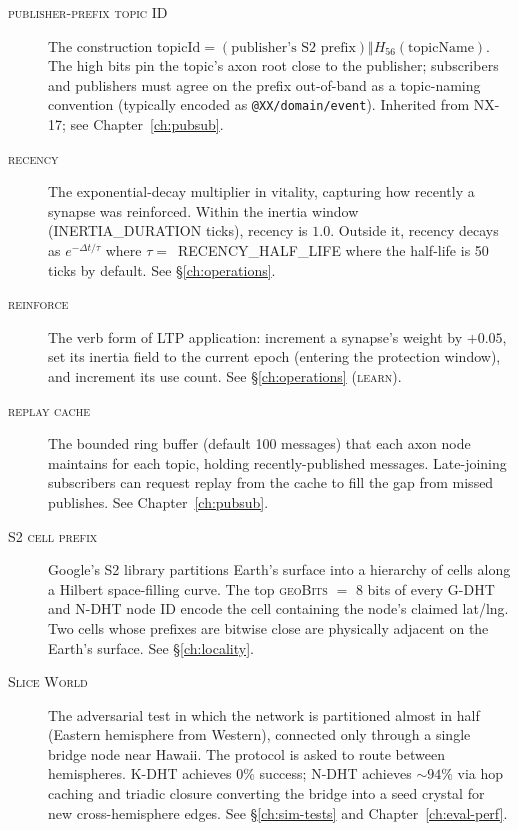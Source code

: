 \documentclass[twoside,nobib]{tufte-book}
\newcommand{\NDHT}{N-DHT\xspace}
\newcommand{\KDHT}{K-DHT\xspace}
\newcommand{\GDHT}{G-DHT\xspace}
\begin{document}
\begin{description}
\item[\textsc{publisher-prefix topic ID}]
The construction $\mathrm{topicId} = (\text{publisher's S2 prefix})
\Vert H_{56}(\mathrm{topicName})$. The high bits pin the topic's
axon root close to the publisher; subscribers and publishers must
agree on the prefix out-of-band as a topic-naming convention
(typically encoded as \texttt{@XX/domain/event}). Inherited from
NX-17; see Chapter~\ref{ch:pubsub}.

\item[\textsc{recency}]
The exponential-decay multiplier in vitality, capturing how
recently a synapse was reinforced. Within the inertia window
(\textsc{INERTIA\_DURATION} ticks), recency is $1.0$. Outside it,
recency decays as $e^{-\Delta t / \tau}$ where
$\tau =$~\textsc{RECENCY\_HALF\_LIFE}
where the half-life is 50 ticks by default. See
\S\ref{ch:operations}.

\item[\textsc{reinforce}]
The verb form of LTP application: increment a synapse's weight by
$+0.05$, set its inertia field to the current epoch (entering the
protection window), and increment its use count. See
\S\ref{ch:operations} (\textsc{learn}).

\item[\textsc{replay cache}]
The bounded ring buffer (default 100 messages) that each axon node
maintains for each topic, holding recently-published messages.
Late-joining subscribers can request replay from the cache to fill
the gap from missed publishes. See Chapter~\ref{ch:pubsub}.

\item[\textsc{S2 cell prefix}]
Google's S2 library partitions Earth's surface into a hierarchy of
cells along a Hilbert space-filling
curve. The top
\textsc{geoBits} $=$ 8 bits of every \GDHT and \NDHT node ID encode
the cell containing the node's claimed lat/lng. Two cells whose
prefixes are bitwise close are physically adjacent on the Earth's
surface. See \S\ref{ch:locality}.

\item[\textsc{Slice World}]
The adversarial test in which the network is partitioned almost in
half (Eastern hemisphere from Western), connected only through a
single bridge node near Hawaii. The protocol is asked to route
between hemispheres. \KDHT achieves $0\%$ success; \NDHT achieves
$\sim 94\%$ via hop caching and triadic closure converting the
bridge into a seed crystal for new cross-hemisphere edges. See
\S\ref{ch:sim-tests} and Chapter~\ref{ch:eval-perf}.


\end{description}
\end{document}
